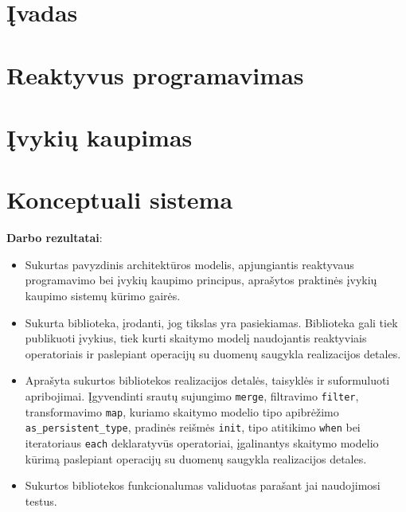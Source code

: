 \documentclass{VUMIFPSmagistrinis}
\begin{document}

\tableofcontents

\section{Įvadas}


\section{Reaktyvus programavimas}


\section{Įvykių kaupimas}


\section{Konceptuali sistema}



\textbf{Darbo rezultatai}:

\begin{itemize}
  \item Sukurtas pavyzdinis architektūros modelis, apjungiantis reaktyvaus programavimo bei įvykių kaupimo principus, aprašytos praktinės įvykių kaupimo sistemų kūrimo gairės.
  \item Sukurta biblioteka, įrodanti, jog tikslas yra pasiekiamas. Biblioteka gali tiek publikuoti įvykius, tiek kurti skaitymo modelį naudojantis reaktyviais operatoriais ir paslepiant operacijų su duomenų saugykla realizacijos detales.
  \item Aprašyta sukurtos bibliotekos realizacijos detalės, taisyklės ir suformuluoti apribojimai. Įgyvendinti srautų sujungimo \lstinline|merge|, filtravimo \lstinline|filter|, transformavimo \lstinline|map|, kuriamo skaitymo modelio tipo apibrėžimo \lstinline|as_persistent_type|, pradinės reišmės \lstinline|init|, tipo atitikimo \lstinline|when| bei iteratoriaus \lstinline|each| deklaratyvūs operatoriai, įgalinantys skaitymo modelio kūrimą paslepiant operacijų su duomenų saugykla realizacijos detales.
  \item Sukurtos bibliotekos funkcionalumas validuotas parašant jai naudojimosi testus.
\end{itemize}
\end{document}

